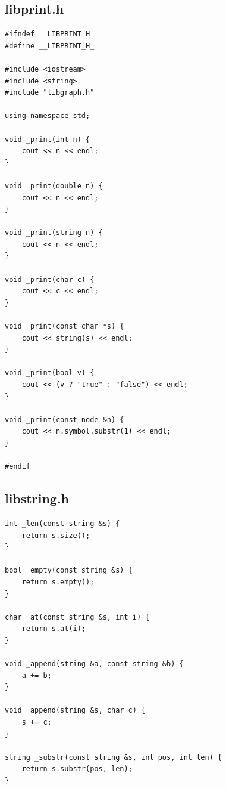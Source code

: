 \documentclass[a4paper,12pt]{article}
\begin{document}
\subsection{libprint.h}
\begin{lstlisting}
#ifndef __LIBPRINT_H_
#define __LIBPRINT_H_

#include <iostream>
#include <string>
#include "libgraph.h"

using namespace std;

void _print(int n) {
	cout << n << endl;
}

void _print(double n) {
	cout << n << endl;
}

void _print(string n) {
	cout << n << endl;
}

void _print(char c) {
	cout << c << endl;
}

void _print(const char *s) {
	cout << string(s) << endl;
}

void _print(bool v) {
	cout << (v ? "true" : "false") << endl;
}

void _print(const node &n) {
	cout << n.symbol.substr(1) << endl;
}

#endif
\end{lstlisting}

\subsection{libstring.h}
\begin{lstlisting}
int _len(const string &s) {
	return s.size();
}

bool _empty(const string &s) {
	return s.empty();
}

char _at(const string &s, int i) {
	return s.at(i);
}

void _append(string &a, const string &b) {
	a += b;
}

void _append(string &s, char c) {
	s += c;
}

string _substr(const string &s, int pos, int len) {
	return s.substr(pos, len);
}
\end{lstlisting}
\end{document}
